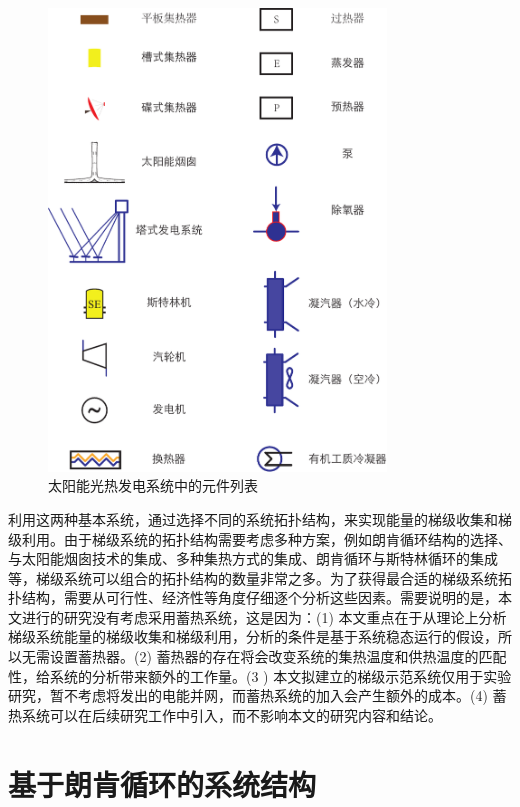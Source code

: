 \begin{figure}[htbp]
\centering
\includegraphics[width=0.8\textwidth]{fig/Legends.pdf}
\caption{太阳能光热发电系统中的元件列表}
\label{fig:Legends}
\end{figure}

利用这两种基本系统，通过选择不同的系统拓扑结构，来实现能量的梯级收集和梯级利用。由于梯级系统的拓扑结构需要考虑多种方案，例如朗肯循环结构的选择、与太阳能烟囱技术的集成、多种集热方式的集成、朗肯循环与斯特林循环的集成等，梯级系统可以组合的拓扑结构的数量非常之多。为了获得最合适的梯级系统拓扑结构，需要从可行性、经济性等角度仔细逐个分析这些因素。需要说明的是，本文进行的研究没有考虑采用蓄热系统，这是因为：(1) 本文重点在于从理论上分析梯级系统能量的梯级收集和梯级利用，分析的条件是基于系统稳态运行的假设，所以无需设置蓄热器。(2) 蓄热器的存在将会改变系统的集热温度和供热温度的匹配性，给系统的分析带来额外的工作量。(3 ) 本文拟建立的梯级示范系统仅用于实验研究，暂不考虑将发出的电能并网，而蓄热系统的加入会产生额外的成本。(4) 蓄热系统可以在后续研究工作中引入，而不影响本文的研究内容和结论。

\section{基于朗肯循环的系统结构}
\label{sec:RankineCycleBased}

